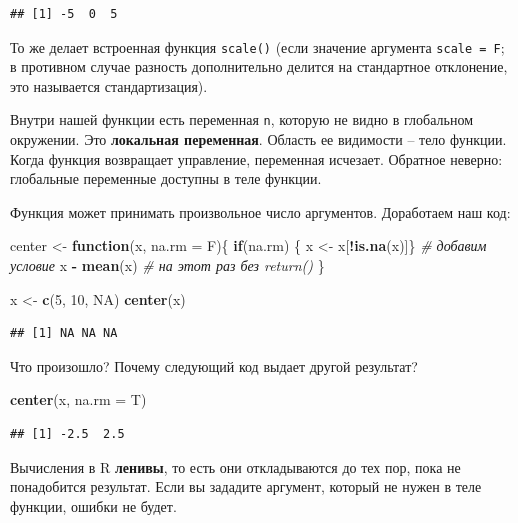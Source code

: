 \documentclass[
]{book}
\newenvironment{Shaded}{\begin{snugshade}}{\end{snugshade}}
\newcommand{\AttributeTok}[1]{\textcolor[rgb]{0.13,0.29,0.53}{#1}}
\newcommand{\CommentTok}[1]{\textcolor[rgb]{0.56,0.35,0.01}{\textit{#1}}}
\newcommand{\ConstantTok}[1]{\textcolor[rgb]{0.56,0.35,0.01}{#1}}
\newcommand{\ControlFlowTok}[1]{\textcolor[rgb]{0.13,0.29,0.53}{\textbf{#1}}}
\newcommand{\DecValTok}[1]{\textcolor[rgb]{0.00,0.00,0.81}{#1}}
\newcommand{\FunctionTok}[1]{\textcolor[rgb]{0.13,0.29,0.53}{\textbf{#1}}}
\newcommand{\NormalTok}[1]{#1}
\newcommand{\OtherTok}[1]{\textcolor[rgb]{0.56,0.35,0.01}{#1}}
\newcommand{\SpecialCharTok}[1]{\textcolor[rgb]{0.81,0.36,0.00}{\textbf{#1}}}
\theoremstyle{definition}
\theoremstyle{definition}
\theoremstyle{definition}
\theoremstyle{definition}
\theoremstyle{remark}
\begin{document}
\begin{verbatim}
## [1] -5  0  5
\end{verbatim}

То же делает встроенная функция \texttt{scale()} (если значение аргумента \texttt{scale\ =\ F}; в противном случае разность дополнительно делится на стандартное отклонение, это называется стандартизация).

Внутри нашей функции есть переменная \texttt{n}, которую не видно в глобальном окружении. Это \textbf{локальная переменная}. Область ее видимости -- тело функции. Когда функция возвращает управление, переменная исчезает. Обратное неверно: глобальные переменные доступны в теле функции.

Функция может принимать произвольное число аргументов. Доработаем наш код:

\begin{Shaded}
\begin{Highlighting}[]
\NormalTok{center }\OtherTok{\textless{}{-}} \ControlFlowTok{function}\NormalTok{(x, }\AttributeTok{na.rm =}\NormalTok{ F)\{}
  \ControlFlowTok{if}\NormalTok{(na.rm) \{ x }\OtherTok{\textless{}{-}}\NormalTok{ x[}\SpecialCharTok{!}\FunctionTok{is.na}\NormalTok{(x)]\} }\CommentTok{\# добавим условие}
\NormalTok{  x }\SpecialCharTok{{-}} \FunctionTok{mean}\NormalTok{(x) }\CommentTok{\# на этот раз без return()}
\NormalTok{\}}

\NormalTok{x }\OtherTok{\textless{}{-}} \FunctionTok{c}\NormalTok{(}\DecValTok{5}\NormalTok{, }\DecValTok{10}\NormalTok{, }\ConstantTok{NA}\NormalTok{)}
\FunctionTok{center}\NormalTok{(x)}
\end{Highlighting}
\end{Shaded}

\begin{verbatim}
## [1] NA NA NA
\end{verbatim}

Что произошло? Почему следующий код выдает другой результат?

\begin{Shaded}
\begin{Highlighting}[]
\FunctionTok{center}\NormalTok{(x, }\AttributeTok{na.rm =}\NormalTok{ T)}
\end{Highlighting}
\end{Shaded}

\begin{verbatim}
## [1] -2.5  2.5
\end{verbatim}

Вычисления в R \textbf{ленивы}, то есть они откладываются до тех пор, пока не понадобится результат. Если вы зададите аргумент, который не нужен в теле функции, ошибки не будет.
\end{document}
